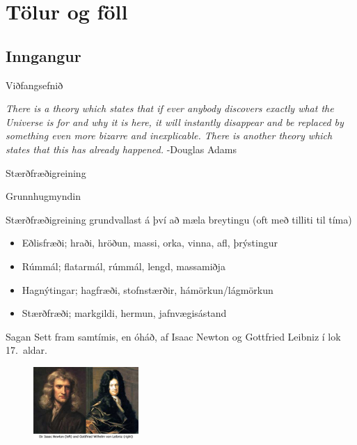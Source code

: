 \documentclass[icelandic,a4paper,12pt]{article}
\date{29. ágúst 2015}
\begin{document}
\begin{frame}
	\maketitle
\end{frame}
\section*{Tölur og föll}
\subsection*{Inngangur}
\begin{frame}{Viðfangsefnið}
 \begin{block}{}
 \emph{There is a theory which states that if ever anybody discovers exactly what the Universe is for and 
  why it is here, it will instantly disappear and be replaced by something even more bizarre and inexplicable. 
  There is another theory which states that this has already happened.} \hfill -Douglas Adams
 \end{block}

\end{frame}

\begin{frame}{Stærðfræðigreining}

\begin{block}{Grunnhugmyndin}

 Stærðfræðigreining grundvallast á því að mæla breytingu (oft með tilliti til tíma)
 \begin{itemize}
  \item Eðlisfræði; hraði, hröðun, massi, orka, vinna, afl, þrýstingur
  \item Rúmmál; flatarmál, rúmmál, lengd, massamiðja
  \item Hagnýtingar; hagfræði, stofnstærðir, hámörkun/lágmörkun 
  \item Stærðfræði; markgildi, hermun, jafnvægisástand
 \end{itemize}
  \end{block}

\pause


\begin{block}{Sagan}
 Sett fram samtímis, en óháð, af Isaac Newton og Gottfried Leibniz í lok 17.~aldar.
\end{block}

\begin{figure}
 \includegraphics[width=4cm]{./myndir/kafli01/01_NewtonLeibniz.jpg}
\end{figure}



\end{frame}
\end{document}
